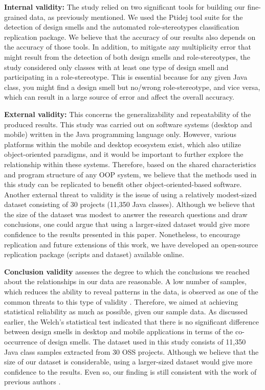 \documentclass[AMA,Times1COL]{WileyNJDv5} %
\begin{document}
	\textbf{Internal validity: }The study relied on two significant tools for building our fine-grained data, as previously mentioned. We used the Ptidej tool suite for the detection of design smells and the automated role-stereotypes classification replication package. We believe that the accuracy of our results also depends on the accuracy of those tools. In addition, to mitigate any multiplicity error that might result from the detection of both design smells and role-stereotypes, the study considered only classes with at least one type of design smell and participating in a role-stereotype. This is essential because for any given Java class, you might find a design smell but no/wrong role-stereotype, and vice versa, which can result in a large source of error and affect the overall accuracy.
	
	\textbf{External validity: }This concerns the generalizability and repeatability of the produced results. This study was carried out on software systems (desktop and mobile) written in the Java programming language only. However, various platforms within the mobile and desktop ecosystem exist, which also utilize object-oriented paradigms, and it would be important to further explore the relationship within these systems. Therefore, based on the shared characteristics and program structure of any OOP system, we believe that the methods used in this study can be replicated to benefit other object-oriented-based software. Another external threat to validity is the issue of using a relatively modest-sized dataset consisting of 30 projects (11,350 Java classes). Although we believe that the size of the dataset was modest to answer the research questions and draw conclusions, one could argue that using a larger-sized dataset would give more confidence to the results presented in this paper. Nonetheless, to encourage replication and future extensions of this work, we have developed an open-source replication package (scripts and dataset) available online.
	
	\textbf{Conclusion validity} assesses the degree to which the conclusions we reached about the relationships in our data are reasonable. A low number of samples, which reduces the ability to reveal patterns in the data, is observed as one of the common threats to this type of validity \cite{wohlin2012experimentation}. Therefore, we aimed at achieving statistical reliability as much as possible, given our sample data. As discussed earlier, the Welch’s statistical test indicated that there is no significant difference between design smells in desktop and mobile applications in terms of the co-occurrence of design smells. The dataset used in this study consists of 11,350 Java class samples extracted from 30 OSS projects. Although we believe that the size of our dataset is considerable, using a larger-sized dataset would give more confidence to the results. Even so, our finding is still consistent with the work of previous authors \cite{mannan2016understanding}.
	
\end{document}
